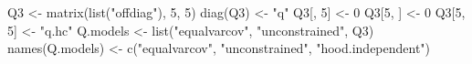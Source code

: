 \begin{Schunk}
\begin{Sinput}
 Q3 <- matrix(list("offdiag"), 5, 5)
 diag(Q3) <- "q"
 Q3[, 5] <- 0
 Q3[5, ] <- 0
 Q3[5, 5] <- "q.hc"
 Q.models <- list("equalvarcov", "unconstrained", Q3)
 names(Q.models) <- c("equalvarcov", "unconstrained", "hood.independent")
\end{Sinput}
\end{Schunk}
